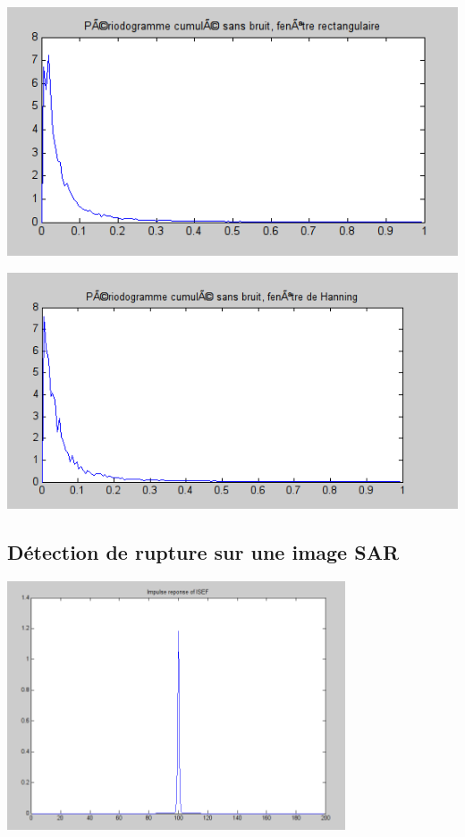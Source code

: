 \documentclass{beamer}
\begin{document}
\begin{frame}
\begin{center}
\includegraphics[scale=0.4]{capture/G.png}
\end{center}
\end{frame}

\begin{frame}
\begin{center}
\includegraphics[scale=0.4]{capture/H.png}
\end{center}
\end{frame}

\begin{frame}
\section{Détection de rupture sur une image SAR}
\includegraphics[width=10cm]{capture/filtre.png}
\end{frame}
\end{document}
